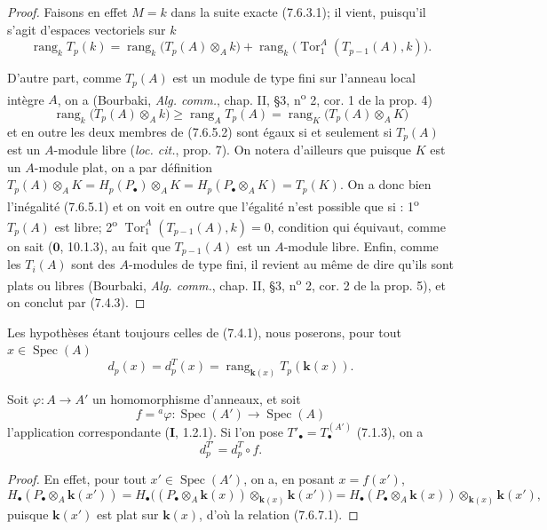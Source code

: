 \begin{proof}
Faisons en effet $M=k$ dans la suite exacte (7.6.3.1); il vient, puisqu'il
s'agit d'espaces vectoriels sur $k$
\[
  \operatorname{rang}_k T_p(k)
  =
  \operatorname{rang}_k\bigl(T_p(A)\otimes_A k\bigr)
  +
  \operatorname{rang}_k\bigl(\operatorname{Tor}_1^A(T_{p-1}(A),k)\bigr).
\]

D'autre part, comme $T_p(A)$ est un module de type fini sur l'anneau local
intègre $A$, on a (Bourbaki, \emph{Alg. comm.}, chap. II, \S 3,
n\textsuperscript{o} 2, cor. 1 de la prop. 4)
\[
  \operatorname{rang}_k\bigl(T_p(A)\otimes_A k\bigr)
  \geq
  \operatorname{rang}_A T_p(A)
  =
  \operatorname{rang}_K\bigl(T_p(A)\otimes_A K\bigr)
  \tag{7.6.5.2}\label{III.7.6.5.2.fr}
\]
et en outre les deux membres de (7.6.5.2) sont égaux si et seulement si $T_p(A)$
est un $A$-module libre (\emph{loc. cit.}, prop. 7). On notera d'ailleurs que
puisque $K$ est un $A$-module plat, on a par définition
$T_p(A)\otimes_A K=H_p(P_\bullet)\otimes_A K=H_p(P_\bullet\otimes_A K)=T_p(K)$.
On a donc bien l'inégalité (7.6.5.1) et on voit en outre que l'égalité n'est
possible que si : 1\textsuperscript{o} $T_p(A)$ est libre;
2\textsuperscript{o} $\operatorname{Tor}_1^A(T_{p-1}(A),k)=0$, condition qui
équivaut, comme on sait ($\mathbf{0}$, 10.1.3), au fait que $T_{p-1}(A)$ est un
$A$-module libre. Enfin, comme les $T_i(A)$ sont des $A$-modules de type fini,
il revient au même de dire qu'ils sont plats ou libres (Bourbaki,
\emph{Alg. comm.}, chap. II, \S 3, n\textsuperscript{o} 2, cor. 2 de la prop.
5), et on conclut par (7.4.3).
\end{proof}

\begin{env}[7.6.6]
Les hypothèses étant toujours celles de (7.4.1), nous poserons, pour tout
$x\in\operatorname{Spec}(A)$
\[
  d_p(x)=d_p^T(x)=\operatorname{rang}_{\mathbf{k}(x)}T_p(\boldsymbol{k}(x)).
  \tag{7.6.6.1}\label{III.7.6.6.1.fr}
\]
\end{env}

\begin{lemma}[7.6.7]
Soit $\varphi:A\to A'$ un homomorphisme d'anneaux, et soit
\[
  f={}^a\!\varphi:
  \operatorname{Spec}(A')\longrightarrow\operatorname{Spec}(A)
\]
l'application correspondante \textup{(\textbf{I}, 1.2.1)}. Si l'on pose
$T'_\bullet=T_\bullet^{(A')}$ \textup{(7.1.3)}, on a
\[
  d_p^{T'}=d_p^T\circ f.
  \tag{7.6.7.1}\label{III.7.6.7.1.fr}
\]
\end{lemma}

\begin{proof}
En effet, pour tout $x'\in\operatorname{Spec}(A')$, on a, en posant
$x=f(x')$,
\[
  H_\bullet(P_\bullet\otimes_A\boldsymbol{k}(x'))
  =
  H_\bullet\bigl((P_\bullet\otimes_A\boldsymbol{k}(x))
    \otimes_{\mathbf{k}(x)}\boldsymbol{k}(x')\bigr)
  =
  H_\bullet(P_\bullet\otimes_A\boldsymbol{k}(x))
    \otimes_{\mathbf{k}(x)}\boldsymbol{k}(x'),
\]
puisque $\boldsymbol{k}(x')$ est plat sur $\boldsymbol{k}(x)$, d'où la relation (7.6.7.1).
\end{proof}

